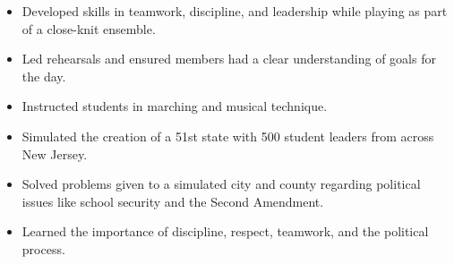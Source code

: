 \documentclass[10pt,a4paper,ragged2e,withhyper]{altacv}
\begin{document}
\begin{paracol}{2}
\divider

\begin{itemize}
    \item Developed skills in teamwork, discipline, and leadership while playing as part of a close-knit ensemble.
    \item Led rehearsals and ensured members had a clear understanding of goals for the day.
    \item Instructed students in marching and musical technique. 
\end{itemize}




\divider

\begin{itemize}
    \item Simulated the creation of a 51st state with 500 student leaders from across New Jersey. 
    \item Solved problems given to a simulated city and county regarding political issues like school security and the Second Amendment.
    \item Learned the importance of discipline, respect, teamwork, and the political process.
\end{itemize}


\end{paracol}
\end{document}
